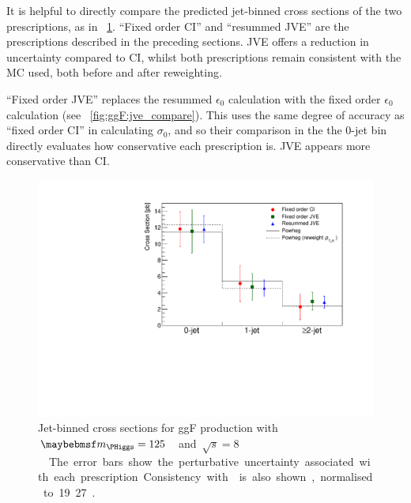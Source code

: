 It is helpful to directly compare the predicted jet-binned cross sections of the two 
prescriptions, as in \Figure~\ref{fig:signal:jetbin_xs_summary}. ``Fixed order CI'' and 
``resummed JVE'' are the prescriptions described in the preceding sections. JVE offers a 
reduction in uncertainty compared to CI, whilst both prescriptions remain consistent with 
the  MC used, both before and after \ptH reweighting.

``Fixed order JVE'' replaces the resummed $\epsilon_0$ calculation with the fixed order 
$\epsilon_0$ calculation (see \Figure~\ref{fig:ggF:jve_compare}). This uses the same 
degree of accuracy as ``fixed order CI'' in calculating $\sigma_0$, and so their comparison 
in the the 0-jet bin directly evaluates how conservative each prescription is. JVE appears 
more conservative than CI.


\begin{figure}[t]
	\includegraphics[width=\largefigwidth]{custom_images/ggF_xs_jetbin}
	\caption{Jet-binned cross sections for ggF production with \unit{$\mH = 125$}{\GeV} and 
	\unit{$\sqrt{s} = 8$}{\TeV}. The error bars show the perturbative uncertainty 
	associated with each prescription. Consistency with  is also shown, normalised to \unit{19.27}{\pico\barn}.}
	\label{fig:signal:jetbin_xs_summary}
\end{figure}

